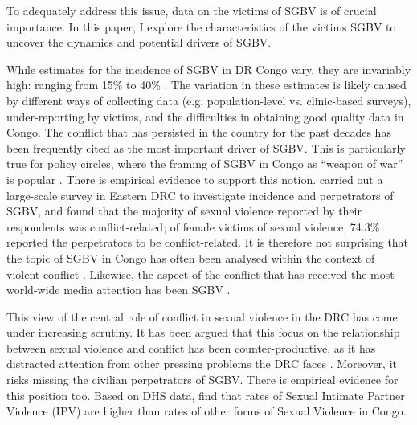 \documentclass[10pt,a4paper,abstract=on]{scrartcl} %
\begin{document}
To adequately address this issue, data on the victims of SGBV is of crucial importance. In this paper, I explore the characteristics of the victims SGBV to uncover the dynamics and potential drivers of SGBV.

While estimates for the incidence of SGBV in DR Congo vary, they are invariably high: ranging from 15\% to 40\% \citep{Johnson2010,Peterman2011}. The variation in these estimates is likely caused by different ways of collecting data (e.g. population-level vs. clinic-based surveys), under-reporting by victims, and the difficulties in obtaining good quality data in Congo. The conflict that has persisted in the country for the past decades has been frequently cited as the most important driver of SGBV. This is particularly true for policy circles, where the framing of SGBV in Congo as ``weapon of war'' is popular \citep{Baaz2013,Kirby2015}. There is empirical evidence to support this notion. \cite{Johnson2010} carried out a large-scale survey in Eastern DRC to investigate incidence and perpetrators of SGBV, and found that the majority of sexual violence reported by their respondents was conflict-related; of female victims of sexual violence, 74.3\% reported the perpetrators to be conflict-related. It is therefore not surprising that the topic of SGBV in Congo has often been analysed within the context of violent conflict \citep{Baaz2013}. Likewise, the aspect of the conflict that has received the most world-wide media attention has been SGBV \citep{Autesserre2012a}.  

This view of the central role of conflict in sexual violence in the DRC has come under increasing scrutiny. It has been argued that this focus on the relationship between sexual violence and conflict has been counter-productive, as it has distracted attention from other pressing problems the DRC faces \citep{Autesserre2012a, Hilhorst2018,Porter2019}. Moreover, it risks missing the civilian perpetrators of SGBV. There is empirical evidence for this position too. Based on DHS data, \cite{Peterman2011} find that rates of Sexual Intimate Partner Violence (IPV) are higher than rates of other forms of Sexual Violence in Congo. 
\end{document}
